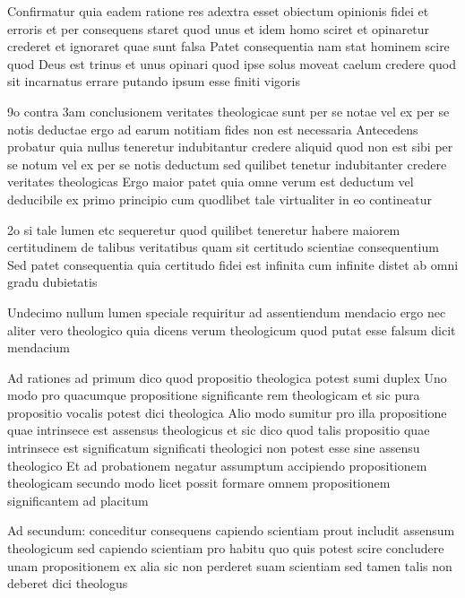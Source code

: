 \documentclass[twoside, openright]{article}
\begin{document}
        \pstart
        Confirmatur quia eadem ratione res adextra esset obiectum opinionis fidei et erroris et per consequens staret quod unus et idem homo sciret et opinaretur crederet et ignoraret quae sunt falsa Patet consequentia nam stat hominem scire quod Deus est trinus et unus opinari quod ipse solus moveat caelum credere quod sit incarnatus errare putando ipsum esse finiti vigoris
        \pend
     
        \pstart
        9o contra 3am conclusionem veritates theologicae sunt per se notae vel ex per se notis deductae ergo ad earum notitiam fides non est necessaria Antecedens probatur quia nullus teneretur indubitantur credere aliquid quod non est sibi per se notum vel ex per se notis deductum sed quilibet tenetur indubitanter credere veritates theologicas Ergo maior patet quia omne verum est deductum vel deducibile ex primo principio cum quodlibet tale virtualiter in eo contineatur
        \pend
     
        \pstart
        2o si tale lumen etc sequeretur quod quilibet teneretur habere maiorem certitudinem de talibus veritatibus quam sit certitudo scientiae consequentium Sed patet consequentia quia certitudo fidei est infinita cum infinite distet ab omni gradu dubietatis
        \pend
     
        \pstart
        Undecimo nullum lumen speciale requiritur ad assentiendum mendacio ergo nec aliter vero theologico quia dicens verum theologicum quod putat esse falsum dicit mendacium 
        \pend
     
        \pstart
        Ad rationes ad primum dico quod propositio theologica potest sumi duplex Uno modo pro quacumque propositione significante rem theologicam et sic pura propositio vocalis potest dici theologica Alio modo sumitur pro illa propositione quae intrinsece est assensus theologicus et sic dico quod talis propositio quae intrinsece est significatum significati theologici non potest esse sine assensu theologico Et ad probationem negatur assumptum accipiendo propositionem theologicam secundo modo licet possit formare omnem propositionem significantem ad placitum
        \pend
     
        \pstart
        Ad secundum: conceditur consequens capiendo scientiam prout includit assensum theologicum sed capiendo scientiam pro habitu quo quis potest scire concludere unam propositionem ex alia sic non perderet suam scientiam sed tamen talis non deberet dici theologus
        \pend
     
\end{document}
